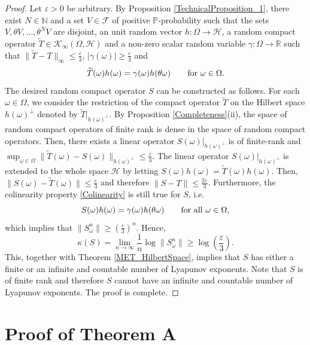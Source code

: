 \documentclass[pdflatex,sn-mathphys-num]{sn-jnl}%
\theoremstyle{thmstyleone}%
\theoremstyle{thmstyletwo}%
\theoremstyle{thmstylethree}%
\newcommand{\N}{\mathbb{N}}
\newcommand{\R}{\mathbb{R}}
\newcommand{\mP}{\mathbb{P}}
\newcommand{\eps}{\varepsilon}
\numberwithin{equation}{section}
\begin{document}
%
%
\begin{proof}
  Let $\eps>0$ be arbitrary.  By Proposition \ref{TechnicalProposition_1}, there exist $N\in\N$ and a set  $V\in\mathcal F$ of positive $\mP$-probability  such that the sets $V,\theta V,\dots, \theta^N V$ are disjoint, an unit random vector $h:\Omega\rightarrow \mathcal H$, a random compact  operator  $\widetilde T\in\mathcal K_{\infty}(\Omega,\mathcal H)$ and a non-zero scalar random variable $\gamma:\Omega\rightarrow\R$ such that $\|\widetilde T- T\|_{\infty}\leq \frac{\eps}{3}$, $|\gamma(\omega)|\geq \frac{\eps}{3}$ and 
\begin{equation}\label{Colinearity}
\widetilde T(\omega) h(\omega)= \gamma(\omega) h(\theta\omega)\qquad \hbox{for  } \omega \in \Omega.
\end{equation}
The desired random compact operator $S$ can be constructed as follows. For each $\omega\in\Omega$, we consider the restriction of the compact operator $\widetilde T$ on the Hilbert space $h(\omega)^{\perp}$ denoted by $\widetilde T|_{h(\omega)^{\perp}}$. By Proposition \ref{Completeness}(ii), the space of random compact operators of finite rank is dense in the space of random compact operators. Then,  there exists a linear operator $S(\omega)|_{h(\omega)^{\perp}}$ is of finite-rank and $\sup_{\omega\in\Omega}\|\widetilde T(\omega)-S(\omega)\|_{h(\omega)^{\perp}}\leq \frac{\eps}{3}$. The linear operator $S(\omega)|_{h(\omega)^{\perp}}$ is extended to the whole space $\mathcal H$ by letting $S(\omega)h(\omega)=\widetilde T(\omega)h(\omega)$. Then, $\|S(\omega)-\widetilde T(\omega)\|\leq \frac{\eps}{3}$ and therefore $\|S-T\|\leq \frac{2\eps}{3}$. Furthermore, the colinearity property \eqref{Colinearity} is still true for $S$, i.e. 
\begin{equation*}
S(\omega) h(\omega)= \gamma(\omega) h(\theta\omega)\qquad \hbox{for all } \omega \in \Omega,
\end{equation*}
 which implies that $\| S^n_{\omega}\|\geq \left(\frac{\eps}{3}\right)^n$. Hence,
 \[
 \kappa(S)=\lim_{n\to\infty}\frac{1}{n}\log\|S^n_{\omega}\|\geq \log\left(\frac{\eps}{3}\right).
 \]
 This, together with Theorem \ref{MET_HilbertSpace}, implies that $S$ has either a finite or an infinite and countable number of Lyapunov exponents. Note that  $S$ is of finite rank and therefore $S$ cannot have an infinite and countable number of Lyapunov exponents. The proof is complete.
 \end{proof}
%
%
%

%
%

\section{Proof of Theorem A}\label{Section_ProofA}
%
\end{document}
